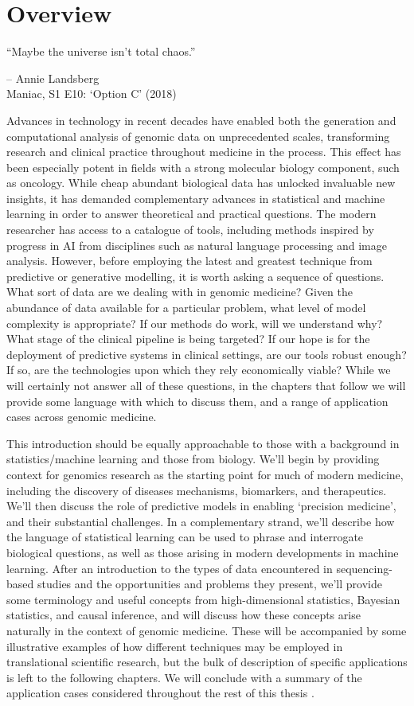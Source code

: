 \documentclass[thesis.tex]{subfiles}
\begin{document}
\section{Overview} 
\epigraph{``Maybe the universe isn’t total chaos.''}{-- Annie Landsberg \\ Maniac, S1 E10: `Option C' (2018)}
Advances in technology in recent decades have enabled both the generation and computational analysis of genomic data on unprecedented scales, transforming research and clinical practice throughout medicine in the process.
This effect has been especially potent in fields with a strong molecular biology component, such as oncology. While cheap abundant biological data has unlocked invaluable new insights, it has demanded complementary advances in statistical and machine learning in order to answer theoretical and practical questions. The modern researcher has access to a catalogue of tools, including methods inspired by progress in AI from disciplines such as natural language processing and image analysis. However, before employing the latest and greatest technique 
from predictive or generative modelling, it is worth asking a sequence of questions. What sort of data are we dealing with in genomic medicine? Given the abundance of data available for a particular problem, what level of model complexity is appropriate? If our methods do work, will we understand why? What stage of the clinical pipeline is being targeted? If our hope is for the deployment of predictive systems in clinical settings, are our tools robust enough? If so, are the technologies upon which they rely economically viable? While we will certainly not answer all of these questions, in the chapters that follow we will provide some language with which to discuss them, and a range of application cases across genomic medicine. 

This introduction should be equally approachable to those with a background in statistics/machine learning and those from biology. We'll begin by providing context for genomics research as the starting point for much of modern medicine, including the discovery of diseases mechanisms, biomarkers, and therapeutics. We'll then discuss the role of predictive models in enabling `precision medicine', and their substantial challenges. In a complementary strand, we'll describe how the language of statistical learning can be used to phrase and interrogate biological questions, as well as those arising in modern developments in machine learning. After an introduction to the types of data encountered in sequencing-based studies and the opportunities and problems they present, we'll provide some terminology and useful concepts from high-dimensional statistics, Bayesian statistics, and causal inference, and will discuss how these concepts arise naturally in the context of genomic medicine. These will be accompanied by some illustrative examples of how different techniques may be employed in translational scientific research, but the bulk of description of specific applications is left to the following chapters. We will conclude with a summary of the application cases considered throughout the rest of this thesis .
\end{document}
